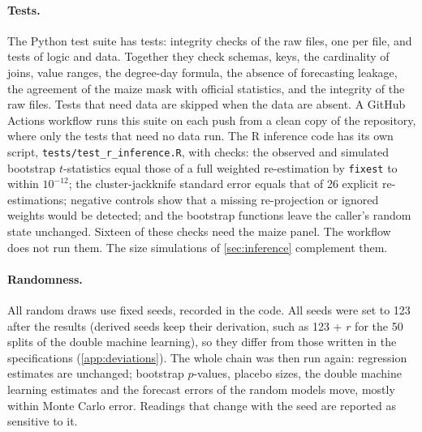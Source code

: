 \paragraph{Tests.} The Python test suite has \TestCount{} tests: \TestIntegrity{} integrity checks of the raw files, one per file, and \TestLogic{} tests of logic and data. Together they check schemas, keys, the cardinality of joins, value ranges, the degree-day formula, the absence of forecasting leakage, the agreement of the maize mask with official statistics, and the integrity of the raw files. Tests that need data are skipped when the data are absent. A GitHub Actions workflow runs this suite on each push from a clean copy of the repository, where only the tests that need no data run. The R inference code has its own script, \texttt{tests/test\_r\_inference.R}, with \TestR{} checks: the observed and simulated bootstrap $t$-statistics equal those of a full weighted re-estimation by \texttt{fixest} to within $10^{-12}$; the cluster-jackknife standard error equals that of 26 explicit re-estimations; negative controls show that a missing re-projection or ignored weights would be detected; and the bootstrap functions leave the caller's random state unchanged. Sixteen of these checks need the maize panel. The workflow does not run them. The size simulations of \cref{sec:inference} complement them.

\paragraph{Randomness.} All random draws use fixed seeds, recorded in the code. All seeds were set to 123 after the results (derived seeds keep their derivation, such as 123 + $r$ for the 50 splits of the double machine learning), so they differ from those written in the specifications (\cref{app:deviations}). The whole chain was then run again: regression estimates are unchanged; bootstrap $p$-values, placebo sizes, the double machine learning estimates and the forecast errors of the random models move, mostly within Monte Carlo error. Readings that change with the seed are reported as sensitive to it.
